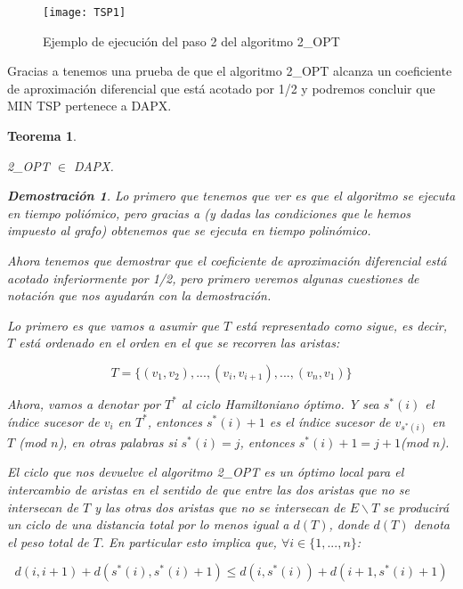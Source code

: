 \documentclass[a4paper,12pt,titlepage]{article}
\newtheorem{teo}{Teorema}[section]
\newtheorem*{dem}{\textbf{Demostraci\'on}}
\begin{document}
\begin{figure}[h]
\centering
\texttt{[image: TSP1]}
\caption{Ejemplo de ejecuci\'on del paso 2 del algoritmo 2\_OPT}
\end{figure}

Gracias a \cite{TSP2} tenemos una prueba de que el algoritmo 2\_OPT alcanza un coeficiente de aproximaci\'on diferencial que est\'a acotado por 1/2 y podremos concluir que MIN TSP pertenece a DAPX.

\begin{teo}
\label{tsp:teo:1}

2\_OPT $\in$ DAPX.

\begin{dem}

Lo primero que tenemos que ver es que el algoritmo se ejecuta en tiempo poli\'omico, pero gracias a \cite{TSP2} (y dadas las condiciones que le hemos impuesto al grafo) obtenemos que se ejecuta en tiempo polin\'omico.

Ahora tenemos que demostrar que el coeficiente de aproximaci\'on diferencial est\'a acotado inferiormente por 1/2, pero primero veremos algunas cuestiones de notaci\'on que nos ayudar\'an con la demostraci\'on.

Lo primero es que vamos a asumir que $T$ est\'a representado como sigue, es decir, $T$ est\'a ordenado en el orden en el que se recorren las aristas:

\begin{equation} \label{tsp:eq:1}
T=\{ (v_1,v_2),...,(v_i,v_{i+1}),...,(v_n,v_1) \}
\end{equation}

Ahora, vamos a denotar por $T^*$ al ciclo Hamiltoniano \'optimo. Y sea $s^*(i)$ el \'indice sucesor de $v_i$ en $T^*$, entonces $s^*(i)+1$ es el \'indice sucesor de $v_{s^*(i)}$ en $T$ (mod $n$), en otras palabras si $s^*(i) = j$, entonces $s^*(i)+1 = j+1 $(mod $n$).

El ciclo que nos devuelve el algoritmo 2\_OPT es un \'optimo local para el intercambio de aristas en el sentido de que entre las dos aristas que no se intersecan de $T$ y las otras dos aristas que no se intersecan de $E\backslash T$ se producir\'a un ciclo de una distancia total por lo menos igual a $d(T)$, donde $d(T)$ denota el peso total de $T$. En particular esto implica que, $\forall i \in \{1,...,n\}$:

\begin{equation} \label{tsp:eq:2}
d(i,i+1)+d(s^*(i),s^*(i)+1) \leq d(i,s^*(i))+d(i+1,s^*(i)+1)
\end{equation}


\end{dem}
\end{teo}
\end{document}
